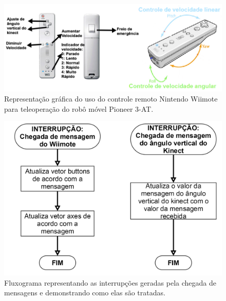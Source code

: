 \begin{figure}[H]
\centering
  \includegraphics[width=12cm]{images/wiimote_botoes.png} 
\caption{\small{Representação gráfica do uso do controle remoto Nintendo Wiimote para teleoperação do robô móvel Pioneer 3-AT.}}
\label{fig:wiimote_botoes}
\end{figure} 

\begin{figure}[H]
\centering
  \includegraphics[width=12cm]{images/INTs.png} 
\caption{\small{Fluxograma representando as interrupções geradas pela chegada de mensagens e demonstrando como elas são tratadas.}}
\label{fig:ints_wii}
\end{figure}

